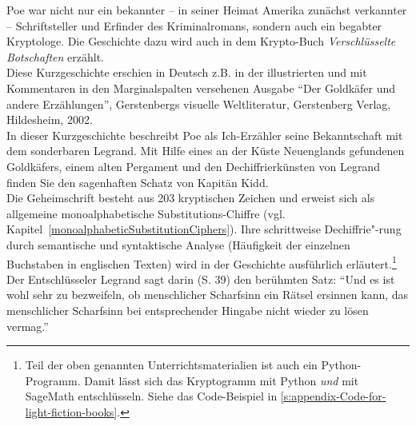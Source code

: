 \begin{description}
{	Poe war nicht nur ein bekannter -- in seiner Heimat Amerika zunächst
	verkannter -- Schriftsteller und Erfinder des Kriminalromans,
	sondern auch ein begabter Kryptologe. Die Geschichte dazu wird auch in dem
	Krypto-Buch {\em Verschlüsselte Botschaften} \cite{Kippenhahn1997}
	erzählt.
    }\\
    Diese Kurzgeschichte erschien in Deutsch z.B. in der illustrierten und
    mit Kommentaren in den Marginalspalten versehenen Ausgabe "`Der Goldkäfer
    und andere Erzählungen"', Gerstenbergs visuelle Weltliteratur,
    Gerstenberg Verlag, Hildesheim, 2002.\\
    In dieser Kurzgeschichte beschreibt Poe als Ich-Erzähler seine
    Bekanntschaft mit dem sonderbaren Legrand. Mit Hilfe eines an der
    Küste Neuenglands gefundenen Goldkäfers, einem alten Pergament und
    den Dechiffrierkünsten von Legrand finden Sie den sagenhaften Schatz
    von Kapitän Kidd.\\
    Die Geheimschrift besteht aus 203 kryptischen Zeichen und erweist sich
    als allgemeine monoalphabetische Substitutions-Chiffre (vgl.
    Kapitel~\ref{monoalphabeticSubstitutionCiphers}). Ihre schrittweise
    Dechiffrie"-rung durch semantische und syntaktische Analyse
    (Häufigkeit der einzelnen Buchstaben in englischen Texten)
    wird in der Geschichte ausführlich erläutert.\footnote{%
      Teil der oben genannten Unterrichtsmaterialien ist auch ein Python-Programm.
      Damit lässt sich das Kryptogramm mit Python {\em und} mit SageMath
      entschlüsseln.
      Siehe das Code-Beispiel in \ref{s:appendix-Code-for-light-fiction-books}.
    }\\
    Der Entschlüsseler Legrand sagt darin (S. 39) den berühmten Satz:
    "`Und es ist wohl sehr zu bezweifeln, ob menschlicher Scharfsinn
    ein Rätsel ersinnen kann, das menschlicher Scharfsinn bei
    entsprechender Hingabe nicht wieder zu lösen vermag."'\\



\end{description}
